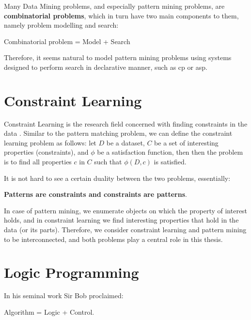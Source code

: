 Many Data Mining problems, and especially pattern mining
problems, are \textbf{combinatorial problems}, which in turn have two main components to them, namely problem modelling and search: 

\begin{center}
  Combinatorial problem = Model + Search
\end{center}

Therefore, it seems natural to model pattern mining problems 
using systems designed to perform search in declarative manner, such as \acrlong{cp} or \acrlong{asp}. %




\section{Constraint Learning}
Constraint Learning is the research field concerned with finding
constraints in the data \parencite{constraint_learning,QUACQ,Conacq}.
Similar to the pattern matching problem, we can define 
the constraint learning problem as follows:
let $D$ be a dataset, $C$ be a set of interesting properties (constraints), and
$\phi$ be a satisfaction function, then
then the problem is to find all properties $c$ in $C$ such that $\phi(D,c)$ is satisfied.

It is not hard to see a certain duality between the two problems, essentially:
\begin{center}
  \textbf{Patterns are constraints and constraints are patterns}.
\end{center}

In case of pattern mining, we enumerate objects on which the property
of interest holds, and in constraint learning we find interesting
properties that hold in the data (or its parts).
Therefore, we consider constraint learning and pattern mining to be interconnected, and both problems play a central role in this thesis.

\section{Logic Programming}
In his seminal work Sir Bob \textcite{kowalski} proclaimed:
\begin{center}
  Algorithm = Logic + Control.
\end{center}


